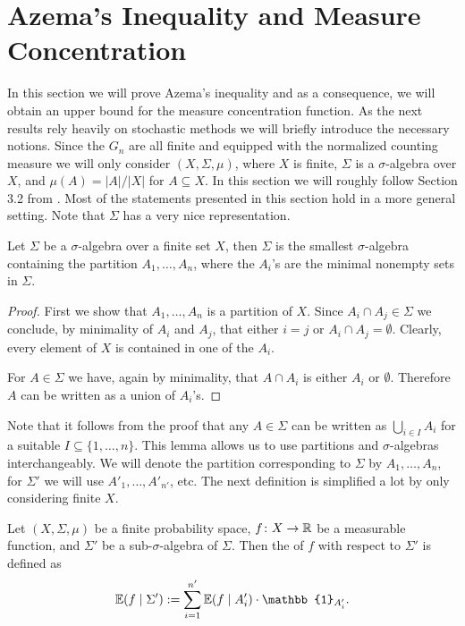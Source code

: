 \section{Azema's Inequality and Measure Concentration}\label{sec:azema}
In this section we will prove Azema's inequality and as a consequence, we will obtain an upper bound for the measure concentration function. As the next results rely heavily on stochastic methods we will briefly introduce the necessary notions. Since the $G_n$ are all finite and equipped with the normalized counting measure we will only consider  $(X,\Sigma,\mu)$, where $X$ is finite, $\Sigma$ is a $\sigma$-algebra over $X$, and $\mu(A)=|A|/|X|$ for $A\subseteq X$. In this section we will roughly follow Section 3.2 from \cite{Azema}. Most of the statements presented in this section hold in a more general setting. Note that $\Sigma$ has a very nice representation.%

\begin{lemma}
Let $\Sigma$ be a $\sigma$-algebra over a finite set $X$, then $\Sigma$ is the smallest $\sigma$-algebra containing the partition $A_1,\dots,A_n$, where the $A_i$'s are the minimal nonempty sets in $\Sigma$.
\end{lemma}
\begin{proof}
First we show that $A_1,\dots,A_n$ is a  partition of $X$. Since $A_i\cap A_j\in\Sigma$ we conclude, by minimality of $A_i$ and $A_j$, that either $i=j$ or $A_i\cap A_j=\emptyset$. Clearly, every element of $X$ is contained in one of the $A_i$. 

For $A\in\Sigma$ we have, again by minimality, that $A\cap A_i$ is either $A_i$ or $\emptyset$. Therefore $A$ can be written as a union of $A_i$'s.
\end{proof}
Note that it follows from the proof that any $A\in\Sigma$ can be written as $\bigcup_{i\in I}A_i$ for a suitable $I\subseteq\{1,\dots,n\}$. This lemma allows us to use partitions and $\sigma$-algebras interchangeably. We will denote the partition corresponding to $\Sigma$ by $A_1,\dots,A_n$, for $\Sigma'$ we will use $A'_1,\dots,A'_{n'}$, etc. The next definition is simplified a lot by only considering finite $X$.

\begin{definition}
Let $(X,\Sigma,\mu)$ be a finite probability space, $f\colon X\to \mathbb{R}$ be a measurable function, and $\Sigma'$ be a sub-$\sigma$-algebra of $\Sigma$. Then the  of $f$ with respect to $\Sigma'$ is defined as
\[\E(f\mid \Sigma'):=\sum_{i=1}^{n'}\E(f\mid A'_i)\cdot \mathbb{1}_{A'_i}.\]
\end{definition}

